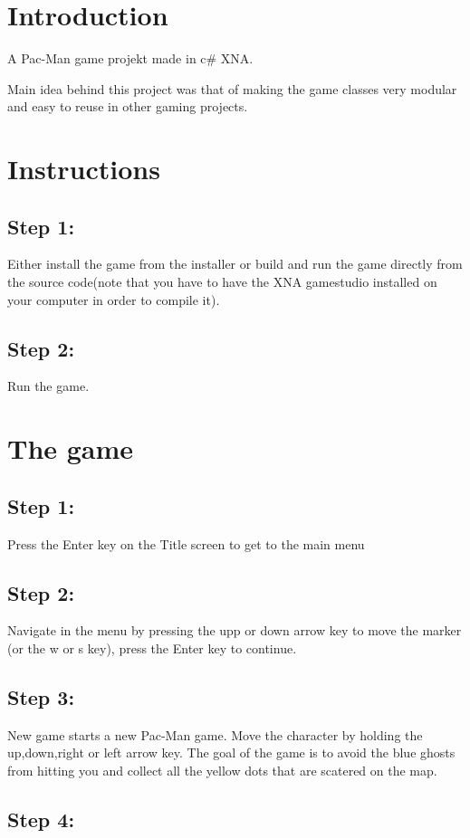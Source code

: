 \hypertarget{index_intro_sec}{}\section{Introduction}\label{index_intro_sec}
A Pac-\/\-Man game projekt made in c\# X\-N\-A.

Main idea behind this project was that of making the game classes very modular and easy to reuse in other gaming projects.  \hypertarget{index_install_sec}{}\section{Instructions}\label{index_install_sec}
\hypertarget{index_step1}{}\subsection{Step 1\-:}\label{index_step1}
Either install the game from the installer or build and run the game directly from the source code(note that you have to have the X\-N\-A gamestudio installed on your computer in order to compile it). \hypertarget{index_step2}{}\subsection{Step 2\-:}\label{index_step2}
Run the game. \hypertarget{index_Running}{}\section{The game}\label{index_Running}
\hypertarget{index_step3}{}\subsection{Step 1\-:}\label{index_step3}
Press the Enter key on the Title screen to get to the main menu \hypertarget{index_step4}{}\subsection{Step 2\-:}\label{index_step4}
Navigate in the menu by pressing the upp or down arrow key to move the marker (or the w or s key), press the Enter key to continue. \hypertarget{index_step5}{}\subsection{Step 3\-:}\label{index_step5}
New game starts a new Pac-\/\-Man game. Move the character by holding the up,down,right or left arrow key. The goal of the game is to avoid the blue ghosts from hitting you and collect all the yellow dots that are scatered on the map. \hypertarget{index_step6}{}\subsection{Step 4\-:}\label{index_step6}
